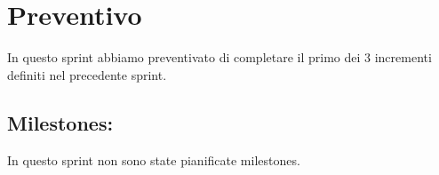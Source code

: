 \section{Preventivo}

In questo sprint abbiamo preventivato di completare il primo dei 3 incrementi definiti nel precedente sprint.

\subsection{Milestones:}  

In questo sprint non sono state pianificate milestones.